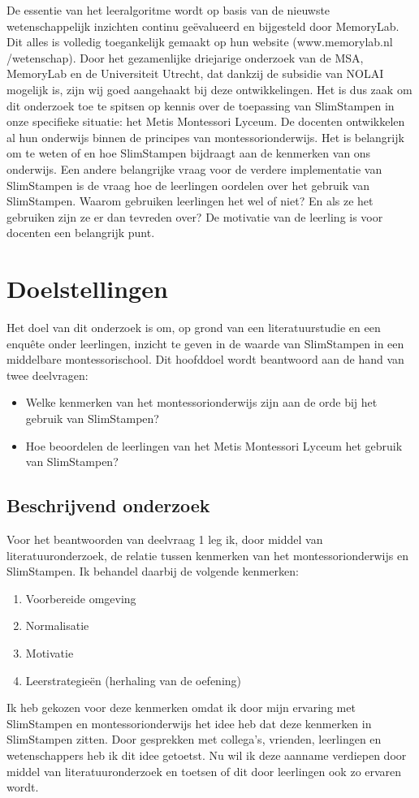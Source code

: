 \documentclass[12pt, a4paper]{article}
\begin{document}
De essentie van het leeralgoritme wordt op basis van de nieuwste wetenschappelijk inzichten continu geëvalueerd en bijgesteld door MemoryLab. Dit alles is volledig toegankelijk gemaakt op hun website (www.memorylab.nl
/wetenschap). Door het gezamenlijke driejarige onderzoek van de MSA, MemoryLab en de Universiteit Utrecht, dat dankzij de subsidie van NOLAI mogelijk is, zijn wij goed aangehaakt bij deze ontwikkelingen. Het is dus zaak om dit onderzoek toe te spitsen op kennis over de toepassing van SlimStampen in onze specifieke situatie: het Metis Montessori Lyceum. De docenten ontwikkelen al hun onderwijs binnen de principes van montessorionderwijs. Het is belangrijk om te weten of en hoe SlimStampen bijdraagt aan de kenmerken van ons onderwijs. Een andere belangrijke vraag voor de verdere implementatie van SlimStampen is de vraag hoe de leerlingen oordelen over het gebruik van SlimStampen. Waarom gebruiken leerlingen het wel of niet? En als ze het gebruiken zijn ze er dan tevreden over? De motivatie van de leerling is voor docenten een belangrijk punt.
\newpage
\section{Doelstellingen}
Het doel van dit onderzoek is om, op grond van een literatuurstudie en een enquête onder leerlingen, inzicht te geven in de waarde van SlimStampen in een middelbare montessorischool. Dit hoofddoel wordt beantwoord aan de hand van twee deelvragen:
\begin{itemize}
    \item Welke kenmerken van het montessorionderwijs zijn aan de orde bij het gebruik van SlimStampen?
    \item Hoe beoordelen de leerlingen van het Metis Montessori Lyceum het gebruik van SlimStampen?
\end{itemize}

\subsection{Beschrijvend onderzoek}
Voor het beantwoorden van deelvraag 1 leg ik, door middel van literatuuronderzoek, de relatie tussen kenmerken van het montessorionderwijs en SlimStampen. Ik behandel daarbij de volgende kenmerken: 
\begin{enumerate}
    \item Voorbereide omgeving
    \item Normalisatie
    \item Motivatie
    \item Leerstrategieën (herhaling van de oefening)
\end{enumerate}
Ik heb gekozen voor deze kenmerken omdat ik door mijn ervaring met SlimStampen en montessorionderwijs het idee heb dat deze kenmerken in SlimStampen zitten. Door gesprekken met collega's, vrienden, leerlingen en wetenschappers heb ik dit idee getoetst. Nu wil ik deze aanname verdiepen door middel van literatuuronderzoek en toetsen of dit door leerlingen ook zo ervaren wordt. 
\end{document}
